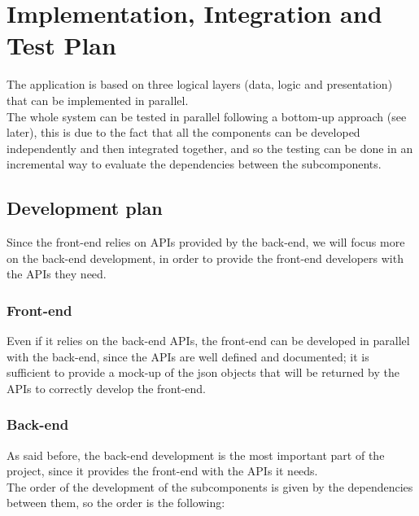 \chapter{Implementation, Integration and Test Plan}

The application is based on three logical layers (data, logic and presentation) that can be implemented in parallel.\\
The whole system can be tested in parallel following a bottom-up approach (see later), this is due to the fact that all the components can be developed independently and then integrated together, and so the testing can be done in an incremental way to evaluate the dependencies between the subcomponents.

\section{Development plan}
Since the front-end relies on APIs provided by the back-end, we will focus more on the back-end development, in order to provide the front-end developers with the APIs they need.

\subsection{Front-end}
Even if it relies on the back-end APIs, the front-end can be developed in parallel with the back-end, since the APIs are well defined and documented; it is sufficient to provide a mock-up of the json objects that will be returned by the APIs to correctly develop the front-end.

\subsection{Back-end}
As said before, the back-end development is the most important part of the project, since it provides the front-end with the APIs it needs.\\
The order of the development of the subcomponents is given by the dependencies between them, so the order is the following:


